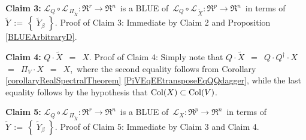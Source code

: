 \begin{enumerate}
	\vskip 0.5cm
	\noindent
	\textbf{Claim 3:}\quad
	$\mathcal{L}_{Q} \circ \mathcal{L}_{\,\Pi_{\widetilde{X}}} : \Re^{r} \longrightarrow \Re^{n}$\,
	is a BLUE of 
	\,$\mathcal{L}_{Q} \circ \mathcal{L}_{\,\widetilde{X}} : \Re^{p} \longrightarrow \Re^{n}$\,
	in terms of
	\,$\widetilde{Y} \,:=\, \left\{\;\widetilde{Y}_{\beta}\;\right\}$.
	\vskip 0.0cm
	\noindent
	Proof of Claim 3:\quad
	Immediate by Claim 2 and Proposition \ref{BLUEArbitraryD}.
	
	\vskip 0.5cm
	\noindent
	\textbf{Claim 4:}\quad
	$Q \cdot \widetilde{X}$ \,$=$\, $X$.
	\vskip 0.0cm
	\noindent
	Proof of Claim 4:\quad
	Simply note that $Q \cdot \widetilde{X}$
	\,$=$\, $Q \cdot Q^{\dagger} \cdot X$
	\,$=$\, $\Pi_{V} \cdot X$
	\,$=$\, $X$,\,
	where the second equality follows from 
	Corollary \ref{corollaryRealSpectralTheorem} \eqref{PiVEqEEtransposeEqQQdagger},
	while the last equality follows by the hypothesis that {\color{red}$\textnormal{Col}(X) \subset \textnormal{Col}(V)$}.

	\vskip 0.5cm
	\noindent
	\textbf{Claim 5:}\quad
	$\mathcal{L}_{Q} \circ \mathcal{L}_{\,\Pi_{\widetilde{X}}} : \Re^{r} \longrightarrow \Re^{n}$\,
	is a BLUE of 
	\,$\mathcal{L}_{X} : \Re^{p} \longrightarrow \Re^{n}$\,
	in terms of
	\,$\widetilde{Y} \,:=\, \left\{\;\widetilde{Y}_{\beta}\;\right\}$.
	\vskip 0.0cm
	\noindent
	Proof of Claim 5:\quad
	Immediate by Claim 3 and Claim 4.


\end{enumerate}
